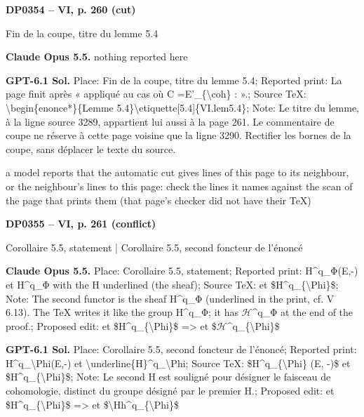 \par\noindent\hypertarget{DP0354}{}\textbf{DP0354 -- VI, p. 260 (cut)}\par
Fin de la coupe, titre du lemme 5.4\par
\textbf{Claude Opus 5.5.} nothing reported here\par
\textbf{GPT-6.1 Sol.} Place: Fin de la coupe, titre du lemme 5.4; Reported print: La page finit après « appliqué au cas où C =\allowbreak  E'\_\{\textbackslash{}coh\} : ».; Source TeX: \textbackslash{}begin\{enonce*\}\{Lemme 5.4\}\textbackslash{}etiquette[5.4]\{VI.lem5.4\}; Note: Le titre du lemme, à la ligne source 3289, appartient lui aussi à la page 261. Le commentaire de coupe ne réserve à cette page voisine que la ligne 3290. Rectifier les bornes de la coupe, sans déplacer le texte du source.\par
a model reports that the automatic cut gives lines of this page to its neighbour, or the neighbour's lines to this page: check the lines it names against the scan of the page that prints them (that page's checker did not have their TeX)\par
\par\noindent\hypertarget{DP0355}{}\textbf{DP0355 -- VI, p. 261 (conflict)}\par
Corollaire 5.5, statement | Corollaire 5.5, second foncteur de l'énoncé\par
\textbf{Claude Opus 5.5.} Place: Corollaire 5.5, statement; Reported print: H\textasciicircum{}q\_Φ(E,-) et H\textasciicircum{}q\_Φ with the H underlined (the sheaf); Source TeX: et \$H\textasciicircum{}q\_\{\textbackslash{}Phi\}\$; Note: The second functor is the sheaf H\textasciicircum{}q\_Φ (underlined in the print, cf. V 6.13). The TeX writes it like the group H\textasciicircum{}q\_Φ; it has \ensuremath{\mathcal{H}}\textasciicircum{}q\_Φ at the end of the proof.; Proposed edit: et \$H\textasciicircum{}q\_\{\textbackslash{}Phi\}\$ =\allowbreak > et \$\ensuremath{\mathcal{H}}\textasciicircum{}q\_\{\textbackslash{}Phi\}\$\par
\textbf{GPT-6.1 Sol.} Place: Corollaire 5.5, second foncteur de l'énoncé; Reported print: H\textasciicircum{}q\_\textbackslash{}Phi(E,-) et \textbackslash{}underline\{H\}\textasciicircum{}q\_\textbackslash{}Phi; Source TeX: \$H\textasciicircum{}q\_\{\textbackslash{}Phi\} (E, -)\$ et \$H\textasciicircum{}q\_\{\textbackslash{}Phi\}\$; Note: Le second H est souligné pour désigner le faisceau de cohomologie, distinct du groupe désigné par le premier H.; Proposed edit: et \$H\textasciicircum{}q\_\{\textbackslash{}Phi\}\$ =\allowbreak > et \$\textbackslash{}Hh\textasciicircum{}q\_\{\textbackslash{}Phi\}\$\par
